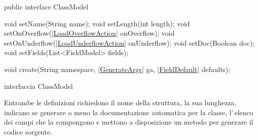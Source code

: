 \documentclass[a4paper,10pt]{report}
\newif\ifesource
\newenvironment{elisting}[1][H]
  {\captionsetup{aboveskip=0pt}\begin{listing}[#1]}
  {\end{listing}%
}
\begin{document}
\ifesource
\begin{figure*}[!htb]
\begin{lstlisting}[language=java, caption=interfaccia ClassModel, 
label=lst:ClassModel]
public interface ClassModel {
    void setName(String name);
    void setLength(int length);
    void setOnOverflow((*\hyperref[lst:LoadOverflowAction]{LoadOverflowAction}*) onOverflow);
    void setOnUnderflow((*\hyperref[lst:LoadUnderflowAction]{LoadUnderflowAction}*) onUnderflow);
    void setDoc(Boolean doc);
    void setFields(List<FieldModel> fields);

    void create(String namespace, (*\hyperref[lst:GenerateArgs]{GenerateArgs}*) ga, (*\hyperref[lst:FieldDefault]{FieldDefault}*) defaults);
}
\end{lstlisting}\index{ClassModel}
\end{figure*}
\else
\begin{elisting}[!htb]
\begin{javacode}
public interface ClassModel {
    void setName(String name);
    void setLength(int length);
    void setOnOverflow(|\hyperref[lst:LoadOverflowAction]{LoadOverflowAction}| onOverflow);
    void setOnUnderflow(|\hyperref[lst:LoadUnderflowAction]{LoadUnderflowAction}| onUnderflow);
    void setDoc(Boolean doc);
    void setFields(List<FieldModel> fields);

    void create(String namespace, |\hyperref[lst:GenerateArgs]{GenerateArgs}| ga, |\hyperref[lst:FieldDefault]{FieldDefault}| defaults);
}
\end{javacode}
\caption{interfaccia ClassModel}
\label{lst:ClassModel}
\end{elisting}
\fi

Entrambe le definizioni richiedono il nome della struttura, la sua
lunghezza, indicano se generare o meno la documentazione automatica per la 
classe, l'\,elenco dei campi che la compongono e mettono a disposizione un 
metodo per generare il codice sorgente.
\end{document}
